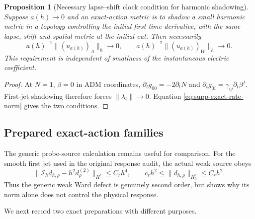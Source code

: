 \documentclass[11pt]{article}
\numberwithin{equation}{section}
\newtheorem{proposition}[proposition]{Proposition}
\theoremstyle{definition}
\theoremstyle{remark}
\begin{document}
\begin{proposition}[Necessary lapse--shift clock condition for harmonic shadowing]
\label{prop:supp-exact-clock-test}
Suppose $a(h)\to0$ and an exact-action metric is to shadow a small harmonic
metric in a topology controlling the initial first time derivative, with the
same lapse, shift and spatial metric at the initial cut.  Then necessarily
\begin{equation}
 a(h)^{-1}\|(u_{a(h)})_A\|_h\to0,
 \qquad a(h)^{-2}\|(u_{a(h)})_W\|_h\to0.
 \label{eq:supp-exact-rate-necessary}
\end{equation}
This requirement is independent of smallness of the instantaneous electric
coefficient.
\end{proposition}
\begin{proof}
At $N=1$, $\beta=0$ in ADM coordinates,
$\partial_tg_{00}=-2\partial_tN$ and
$\partial_tg_{0i}=\gamma_{ij}\partial_t\beta^j$.  First-jet shadowing
therefore forces $\|\lambda_t\|\to0$.  Equation
\eqref{eq:supp-exact-rate-norm} gives the two conditions.
\end{proof}

\subsection{Prepared exact-action families}

The generic probe-source calculation remains useful for comparison.  For the
smooth first jet used in the original response audit, the actual weak source
obeys
\begin{equation}
 \|\mathcal I_hd_{h,\rho}-h^2d_\rho^{(2)}\|_{H^r}\le C_rh^4,
 \qquad c_rh^2\le\|d_{h,\rho}\|_{H_h^r}\le C_rh^2.
 \label{eq:supp-exact-source-expansion}
\end{equation}
Thus the generic weak Ward defect is genuinely second order, but
 shows why its norm alone does not
control the physical response.

We next record two exact preparations with different purposes.
\end{document}
